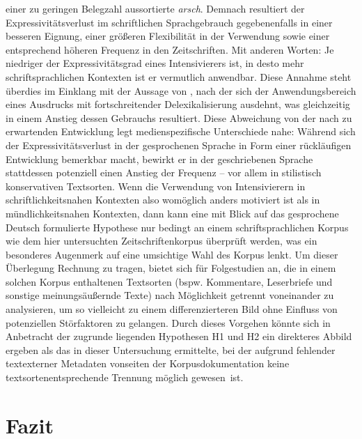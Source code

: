 einer zu geringen Belegzahl aussortierte \textit{arsch}. Demnach resultiert der Expressivitätsverlust im schriftlichen Sprachgebrauch gegebenenfalls in einer besseren Eignung, einer größeren Flexibilität in der Verwendung sowie einer entsprechend höheren Frequenz in den Zeitschriften. Mit anderen Worten: Je niedriger der Expressivitätsgrad eines Intensivierers ist, in desto mehr schriftsprachlichen Kontexten ist er vermutlich anwendbar. Diese Annahme steht überdies im Einklang mit der Aussage von \mbox{\citet[420]{Breindl.2007}}, nach der sich der Anwendungsbereich eines Ausdrucks mit fortschreitender Delexikalisierung ausdehnt, was gleichzeitig in einem Anstieg dessen Gebrauchs resultiert. Diese Abweichung von der nach \citet[]{Kirschbaum.2002b} zu erwartenden Entwicklung legt medienspezifische Unterschiede nahe: Während sich der Expressivitätsverlust in der gesprochenen Sprache in Form einer rückläufigen Entwicklung bemerkbar macht, bewirkt er in der geschriebenen Sprache stattdessen potenziell einen Anstieg der Frequenz -- vor allem in stilistisch konservativen Textsorten. Wenn die Verwendung von Intensivierern in schriftlichkeitsnahen Kontexten also womöglich anders motiviert ist als in mündlichkeitsnahen Kontexten, dann kann eine mit Blick auf das gesprochene Deutsch formulierte Hypothese nur bedingt an einem schriftsprachlichen Korpus wie dem hier untersuchten Zeitschriftenkorpus überprüft werden, was ein besonderes Augenmerk auf eine umsichtige Wahl des Korpus lenkt. Um dieser Überlegung Rechnung zu tragen, bietet sich für Folgestudien an, die in einem solchen Korpus enthaltenen Textsorten (bspw. Kommentare, Leserbriefe und sonstige meinungsäußernde Texte) nach Möglichkeit getrennt voneinander zu analysieren, um so vielleicht zu einem differenzierteren Bild ohne Einfluss von potenziellen Störfaktoren zu gelangen. Durch dieses Vorgehen könnte sich in Anbetracht der zugrunde liegenden Hypothesen H1 und H2 ein direkteres Abbild ergeben als das in dieser Untersuchung ermittelte, bei der aufgrund fehlender textexterner Metadaten vonseiten der Korpusdokumentation keine textsortenentsprechende Trennung möglich \mbox{gewesen ist}.

\section{Fazit}

